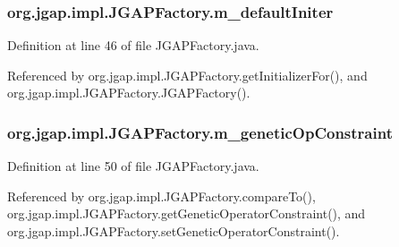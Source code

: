 \hypertarget{classorg_1_1jgap_1_1impl_1_1_j_g_a_p_factory_ab3c5ae39ff5fab63191ea71bcd7aa083}{
\subsubsection[{m\-\_\-default\-Initer}]{ org.\-jgap.\-impl.\-J\-G\-A\-P\-Factory.\-m\-\_\-default\-Initer\hspace{0.3cm}{\ttfamily [private]}}}\label{classorg_1_1jgap_1_1impl_1_1_j_g_a_p_factory_ab3c5ae39ff5fab63191ea71bcd7aa083}


Definition at line 46 of file J\-G\-A\-P\-Factory.\-java.



Referenced by org.\-jgap.\-impl.\-J\-G\-A\-P\-Factory.\-get\-Initializer\-For(), and org.\-jgap.\-impl.\-J\-G\-A\-P\-Factory.\-J\-G\-A\-P\-Factory().

\hypertarget{classorg_1_1jgap_1_1impl_1_1_j_g_a_p_factory_a3693b9066d03ed3d0856b1d9ced4cf9e}{
\subsubsection[{m\-\_\-genetic\-Op\-Constraint}]{ org.\-jgap.\-impl.\-J\-G\-A\-P\-Factory.\-m\-\_\-genetic\-Op\-Constraint\hspace{0.3cm}{\ttfamily [private]}}}\label{classorg_1_1jgap_1_1impl_1_1_j_g_a_p_factory_a3693b9066d03ed3d0856b1d9ced4cf9e}


Definition at line 50 of file J\-G\-A\-P\-Factory.\-java.



Referenced by org.\-jgap.\-impl.\-J\-G\-A\-P\-Factory.\-compare\-To(), org.\-jgap.\-impl.\-J\-G\-A\-P\-Factory.\-get\-Genetic\-Operator\-Constraint(), and org.\-jgap.\-impl.\-J\-G\-A\-P\-Factory.\-set\-Genetic\-Operator\-Constraint().

